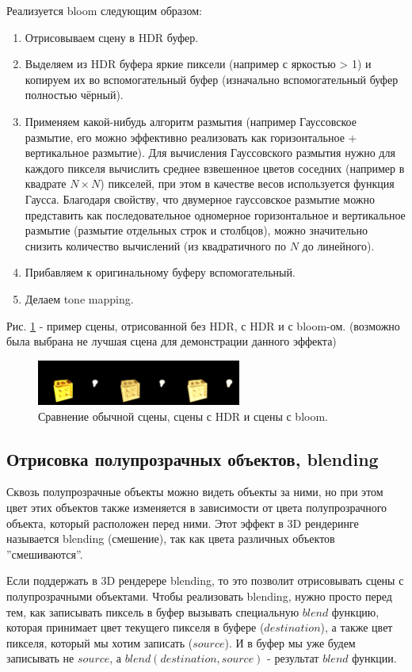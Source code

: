 \documentclass[14pt]{extarticle}
\begin{document}
Реализуется bloom следующим образом:
\begin{enumerate}
	\item Отрисовываем сцену в HDR буфер.
	\item Выделяем из HDR буфера яркие пиксели (например с яркостью > 1) и копируем их во вспомогательный буфер (изначально вспомогательный буфер полностью чёрный).
	\item Применяем какой-нибудь алгоритм размытия (например Гауссовское размытие, его можно эффективно реализовать как горизонтальное + вертикальное размытие). Для вычисления Гауссовского размытия нужно для каждого пикселя вычислить среднее взвешенное цветов соседних (например в квадрате $N\times N$) пикселей, при этом в качестве весов используется функция Гаусса. Благодаря свойству, что двумерное гауссовское размытие можно представить как последовательное одномерное горизонтальное и вертикальное размытие (размытие отдельных строк и столбцов), можно значительно снизить количество вычислений (из квадратичного по $N$ до линейного). 
	\item Прибавляем к оригинальному буферу вспомогательный.
	\item Делаем tone mapping.
\end{enumerate}

Рис. \ref{fig:bloom} - пример сцены, отрисованной без HDR, с HDR и с bloom-ом. (возможно была выбрана не лучшая сцена для демонстрации данного эффекта)

\begin{figure}
	\label{fig:bloom}
	\caption{Сравнение обычной сцены, сцены с HDR и сцены с bloom.}
	\includegraphics[width=0.6\textwidth]{bloom.png}
\end{figure}

\subsection{Отрисовка полупрозрачных объектов, blending}
Сквозь полупрозрачные объекты можно видеть объекты за ними, но при этом цвет этих объектов также изменяется в зависимости от цвета полупрозрачного объекта, который расположен перед ними. Этот эффект в 3D рендеринге называется blending (смешение), так как цвета различных объектов ''смешиваются''. 

Если поддержать в 3D рендерере blending, то это позволит отрисовывать сцены с полупрозрачными объектами. Чтобы реализовать blending, нужно просто перед тем, как записывать пиксель в буфер вызывать специальную $blend$ функцию, которая принимает цвет текущего пикселя в буфере ($destination$), а также цвет пикселя, который мы хотим записать ($source$). И в буфер мы уже будем записывать не $source$, а $blend(destination, source)$ - результат $blend$ функции. 
\end{document}
